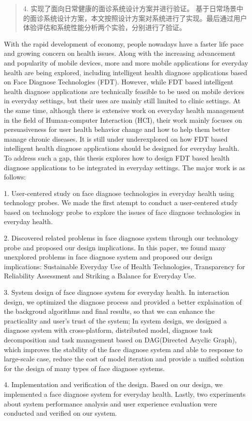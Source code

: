 \documentclass[oneside,type=master]{fduthesis}
\begin{document}
\begin{abstract}
4. 实现了面向日常健康的面诊系统设计方案并进行验证。
基于日常场景中的面诊系统设计方案，本文按照设计方案对系统进行了实现。最后通过用户体验评估和系统性能分析两个实验，分别进行了验证。

\end{abstract}

\begin{abstract*}

With the rapid development of economy, people nowadays have a faster life pace and growing concern on health issues. 
Along with the increasing advancement and popularity of mobile devices, more and more mobile applications for everyday health are being explored, including intelligent health diagnose applications based on Face Diagnose Technologies (FDT). However, while FDT based intelligent health diagnose applications are technically feasible to be used on mobile devices in everyday settings, but their uses are mainly still limited to clinic settings. At the same time, although there is extensive work on everyday health management in the field of Human-computer Interaction (HCI), their work mainly focuses on persuasiveness for user health behavior change and how to help them better manage chronic diseases. It is still under underexplored on how FDT based intelligent health diagnose applications should be designed for everyday health.
To address such a gap, this thesis explores how to design FDT based health diagnose applications to be integrated in everyday settings. The major work is as follows: 

1. User-centered study on face diagnose technologies in everyday health using technology probes.
We made the first atempt to conduct a user-centered study based on technology probe to explore the issues of face diagnose technologies in everyday health.

2. Discovered related problems in face diagnose system through our technology probe and proposed our design implications.
In this paper, we found many unexplored problems in face diagnose system and proposed our design implications: Sustainable Everyday Use of Health Technologies, Transparency for Reliability Assessment and Striking a Balance for Everyday Use. 

3. System design of face diagnose system for everyday health.
In interaction design, we optimized the diagnose process and provided a better explaination of the backgroud algorithms and final results, so that we can enhance the practicality and user's trust of the system;
In system design, we designed a diagnose system with cross-platform, distributed model, diagnose task decomposition and task management based on DAG(Directed Acyclic Graph), which improves the stability of the face diagnose system and able to response to large-scale case, reduce the cost of model iteration and provide a unified solution for the design of many types of face diagnose systems.

4. Implementation and verification of the design.
Based on our design, we implemented a face diagnose system for everyday health. Lastly, two experiments about system performance analysis and user experience evaluation were conducted and verified on our system.


\end{abstract*}
\end{document}
